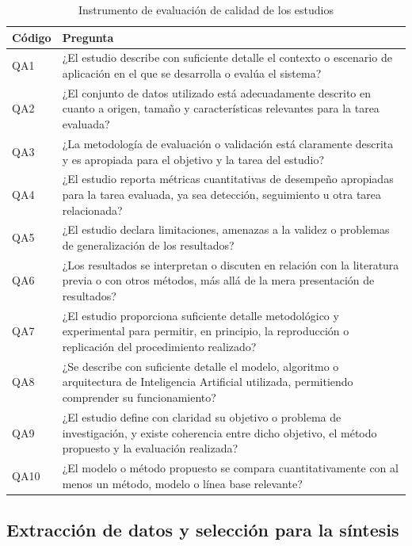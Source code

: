 \documentclass[pdflatex,sn-mathphys-num]{sn-jnl}%
\theoremstyle{thmstyleone}%
\theoremstyle{thmstyletwo}%
\theoremstyle{thmstylethree}%
\begin{document}
\begin{table}[htbp]
\caption{Instrumento de evaluación de calidad de los estudios}\label{tab:qa}
\begin{tabular}{@{}L{1.0cm}L{11.5cm}@{}}
\toprule
Código & Pregunta \\
\midrule
QA1 & ¿El estudio describe con suficiente detalle el contexto o escenario de aplicación en el que se desarrolla o evalúa el sistema? \\
QA2 & ¿El conjunto de datos utilizado está adecuadamente descrito en cuanto a origen, tamaño y características relevantes para la tarea evaluada? \\
QA3 & ¿La metodología de evaluación o validación está claramente descrita y es apropiada para el objetivo y la tarea del estudio? \\
QA4 & ¿El estudio reporta métricas cuantitativas de desempeño apropiadas para la tarea evaluada, ya sea detección, seguimiento u otra tarea relacionada? \\
QA5 & ¿El estudio declara limitaciones, amenazas a la validez o problemas de generalización de los resultados? \\
QA6 & ¿Los resultados se interpretan o discuten en relación con la literatura previa o con otros métodos, más allá de la mera presentación de resultados? \\
QA7 & ¿El estudio proporciona suficiente detalle metodológico y experimental para permitir, en principio, la reproducción o replicación del procedimiento realizado? \\
QA8 & ¿Se describe con suficiente detalle el modelo, algoritmo o arquitectura de Inteligencia Artificial utilizada, permitiendo comprender su funcionamiento? \\
QA9 & ¿El estudio define con claridad su objetivo o problema de investigación, y existe coherencia entre dicho objetivo, el método propuesto y la evaluación realizada? \\
QA10 & ¿El modelo o método propuesto se compara cuantitativamente con al menos un método, modelo o línea base relevante? \\
\bottomrule
\end{tabular}
\end{table}

\FloatBarrier
\subsection{Extracción de datos y selección para la síntesis}\label{subsec:extraccion}
\end{document}
